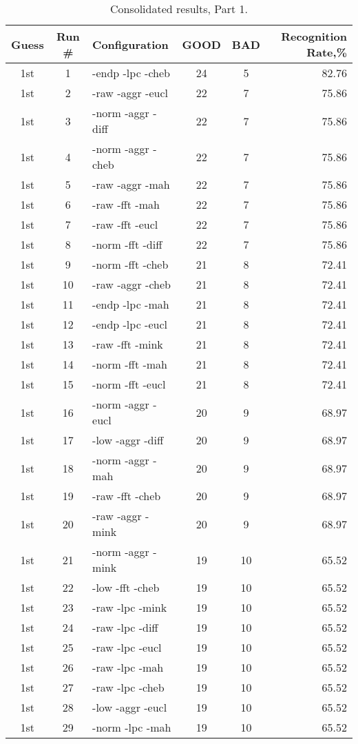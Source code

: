 \begin{table}
\begin{minipage}[b]{\textwidth}
\centering
\begin{tabular}{|c|c|l|c|c|r|} \hline
Guess & Run \# & Configuration & GOOD & BAD & Recognition Rate,\%\\ \hline\hline
1st & 1 & -endp -lpc -cheb  & 24 & 5 & 82.76\\ \hline
1st & 2 & -raw -aggr -eucl  & 22 & 7 & 75.86\\ \hline
1st & 3 & -norm -aggr -diff  & 22 & 7 & 75.86\\ \hline
1st & 4 & -norm -aggr -cheb  & 22 & 7 & 75.86\\ \hline
1st & 5 & -raw -aggr -mah  & 22 & 7 & 75.86\\ \hline
1st & 6 & -raw -fft -mah  & 22 & 7 & 75.86\\ \hline
1st & 7 & -raw -fft -eucl  & 22 & 7 & 75.86\\ \hline
1st & 8 & -norm -fft -diff  & 22 & 7 & 75.86\\ \hline
1st & 9 & -norm -fft -cheb  & 21 & 8 & 72.41\\ \hline
1st & 10 & -raw -aggr -cheb  & 21 & 8 & 72.41\\ \hline
1st & 11 & -endp -lpc -mah  & 21 & 8 & 72.41\\ \hline
1st & 12 & -endp -lpc -eucl  & 21 & 8 & 72.41\\ \hline
1st & 13 & -raw -fft -mink  & 21 & 8 & 72.41\\ \hline
1st & 14 & -norm -fft -mah  & 21 & 8 & 72.41\\ \hline
1st & 15 & -norm -fft -eucl  & 21 & 8 & 72.41\\ \hline
1st & 16 & -norm -aggr -eucl  & 20 & 9 & 68.97\\ \hline
1st & 17 & -low -aggr -diff  & 20 & 9 & 68.97\\ \hline
1st & 18 & -norm -aggr -mah  & 20 & 9 & 68.97\\ \hline
1st & 19 & -raw -fft -cheb  & 20 & 9 & 68.97\\ \hline
1st & 20 & -raw -aggr -mink  & 20 & 9 & 68.97\\ \hline
1st & 21 & -norm -aggr -mink  & 19 & 10 & 65.52\\ \hline
1st & 22 & -low -fft -cheb  & 19 & 10 & 65.52\\ \hline
1st & 23 & -raw -lpc -mink  & 19 & 10 & 65.52\\ \hline
1st & 24 & -raw -lpc -diff  & 19 & 10 & 65.52\\ \hline
1st & 25 & -raw -lpc -eucl  & 19 & 10 & 65.52\\ \hline
1st & 26 & -raw -lpc -mah  & 19 & 10 & 65.52\\ \hline
1st & 27 & -raw -lpc -cheb  & 19 & 10 & 65.52\\ \hline
1st & 28 & -low -aggr -eucl  & 19 & 10 & 65.52\\ \hline
1st & 29 & -norm -lpc -mah  & 19 & 10 & 65.52\\ \hline
\end{tabular}
\end{minipage}
\caption{Consolidated results, Part 1.}
\label{tab:results1}
\end{table}

